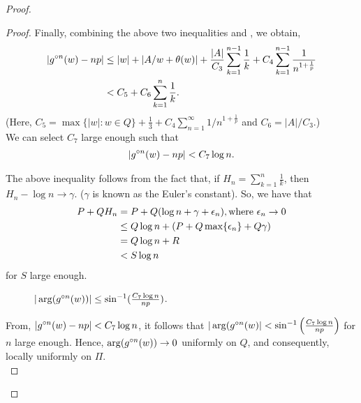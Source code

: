 \begin{proof}
\begin{proof}
Finally, combining the above two inequalities and , we obtain,
\begin{align*}
	|\gog[n](w)-np|&\le |w|+|A /w+\theta (w)|+\frac{|A|}{C_3}\sum_{k=1}^{n-1} \frac{1}{k}+C_4\sum_{k=1}^{n-1} \frac{1}{n^{1+\frac{1}{p}}}\\
				   &< C_5+C_6\sum_{k=1}^{n} \frac{1}{k}
.\end{align*}
(Here, \( C_5=\max\{|w|:w\in Q\}+\frac{1}{3}+C_4\sum_{n=1}^{\infty}  1 /n^{1+\frac{1}{p}} \) and \( C_6=|A| /C_3\).)\\
We can select \( C_7 \) large enough such that
\begin{align}
	|\gog[n](w)-np|<C_7 \log n \label{eqn3.7}
.\end{align}

\begin{remark}
	The above inequality follows from the fact that, if \( H_n=\sum_{k=1}^n \frac{1}{k} \), then \( H_n-\log n\to \gamma \).
	(\( \gamma \) is known as the Euler's constant).
	So, we have that
	\begin{align*}
		P+QH_n &=P+Q(\log n+\gamma +\epsilon_n), \text{where \( \epsilon_n\to 0 \)}\\
			   &\le Q\log n+(P+Q\max\{\epsilon_n\}+Q\gamma)\\
			   &=Q\log n+R\\
			   &<S \log n
	\end{align*} for \( S \) large enough.
\end{remark}

\begin{figure}[ht]
    \centering
	\caption{$|\arg(\gog[n](w))|\le \sin^{-1}(\frac{C_7 \log n}{np})$.}
    \label{argogn}
\end{figure}
From, \( |\gog[n](w)-np|<C_7\log n \), it follows that \( |\arg(\gog[n](w)|<\sin ^{-1}\left(\frac{C_7\log n}{np}\right) \)
for \( n \) large enough. Hence, \( \arg(\gog[n](w))\to 0 \) uniformly on \( Q \), and consequently, locally uniformly on \( \Pi \).\\
\vspace{1pt}


\end{proof}
\end{proof}
